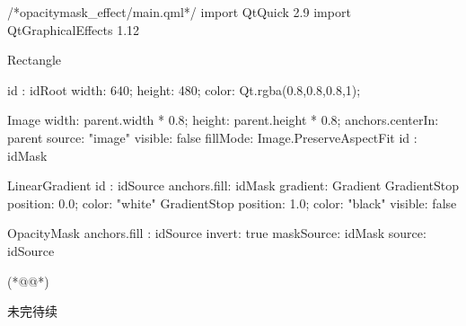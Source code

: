 \label{f000075}    %
\FloatBarrier                                  %
\begin{thebookfilesourceone}[escapeinside={(*@}{@*)},
caption=GoodLuck,
title=\filesourcenumbernameone \thefilesourcenumber
]
/*opacitymask_effect/main.qml*/
import QtQuick 2.9
import QtGraphicalEffects 1.12

Rectangle {
    id : idRoot
    width: 640;
    height: 480;
    color: Qt.rgba(0.8,0.8,0.8,1);

    Image{
        width: parent.width * 0.8;
        height: parent.height * 0.8;
        anchors.centerIn: parent
        source: "image"
        visible: false
        fillMode: Image.PreserveAspectFit
        id : idMask
    }

    LinearGradient{
        id : idSource
        anchors.fill: idMask
        gradient: Gradient {
            GradientStop { position: 0.0; color: "white" }
            GradientStop { position: 1.0; color: "black" }
        }
        visible: false
    }

    OpacityMask{
        anchors.fill : idSource
        invert: true
        maskSource: idMask
        source: idSource
    }

}(*@\marginpar[\hfill\setlength\fboxsep{2pt}\fbox{\footnotesize{\kaishu\parbox{1em}{\setlength{\baselineskip}{2pt}\filesourcenumbernameone}}\footnotesize{\thefilesourcenumber}}]{\setlength\fboxsep{2pt}\fbox{\footnotesize{\kaishu\parbox{1em}{\setlength{\baselineskip}{2pt}\filesourcenumbernameone}}\footnotesize{\thefilesourcenumber}}}@*)\end{thebookfilesourceone}          %
\addtocounter{lstlisting}{-1}   %


未完待续









